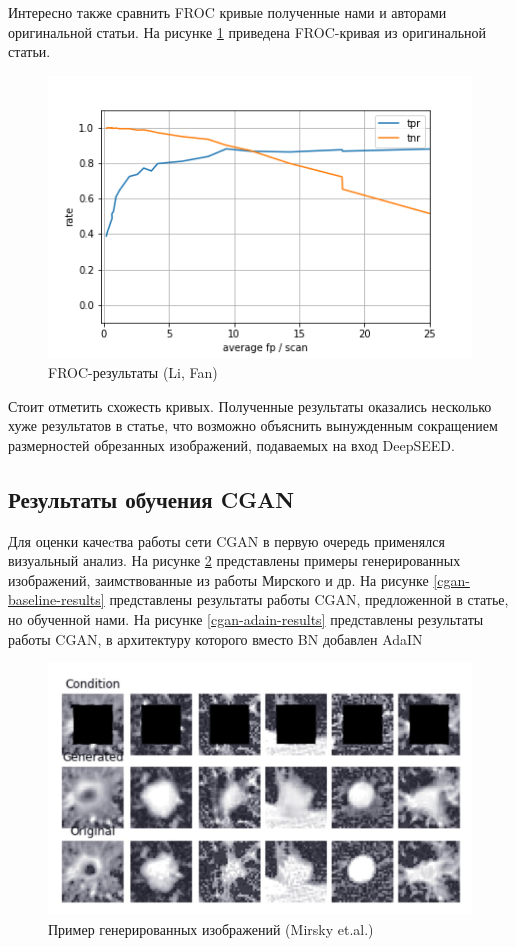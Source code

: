 Интересно также сравнить FROC кривые полученные нами и авторами оригинальной статьи. На рисунке \ref{froc-lifan} приведена FROC-кривая из оригинальной статьи.

\begin{figure}[!h]
\includegraphics[width=\linewidth]{froc.png}
\caption{FROC-результаты (Li, Fan)}\label{froc-lifan}
\centering
\end{figure}

Стоит отметить схожесть кривых. Полученные результаты оказались несколько хуже результатов в статье, что возможно объяснить вынужденным сокращением размерностей обрезанных изображений, подаваемых на вход DeepSEED.

\subsection{Результаты обучения CGAN}

Для оценки качеcтва работы сети CGAN в первую очередь применялся визуальный анализ. На рисунке \ref{mirskiy-results} представлены примеры генерированных изображений, заимствованные из работы Мирского и др. На рисунке \ref{cgan-baseline-results} представлены результаты работы CGAN, предложенной в статье, но обученной нами. На рисунке \ref{cgan-adain-results} представлены результаты работы CGAN, в архитектуру которого вместо BN добавлен AdaIN

\begin{figure}[!h]
\includegraphics[width=\linewidth]{mirskiy-results.jpg}
\caption{Пример генерированных изображений (Mirsky et.al.)}\label{mirskiy-results}
\centering
\end{figure}

